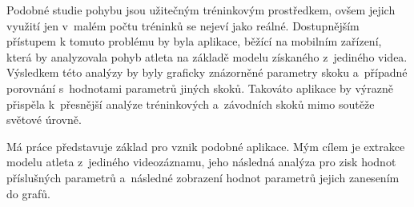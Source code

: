 Podobné studie pohybu jsou užitečným tréninkovým prostředkem, ovšem jejich využití jen v~malém počtu tréninků se nejeví jako reálné. Dostupnějším přístupem k tomuto problému by byla aplikace, běžící na mobilním zařízení, která by analyzovala pohyb atleta na základě modelu získaného z~jediného videa. Výsledkem této analýzy by byly graficky znázorněné parametry skoku a~případné porovnání s~hodnotami parametrů jiných skoků. Takováto aplikace by výrazně přispěla k~přesnější analýze tréninkových a~závodních skoků mimo soutěže světové úrovně.

Má práce představuje základ pro vznik podobné aplikace. Mým cílem je extrakce modelu atleta z~jediného videozáznamu, jeho následná analýza pro zisk hodnot příslušných parametrů a~následné zobrazení hodnot parametrů jejich zanesením do grafů.

